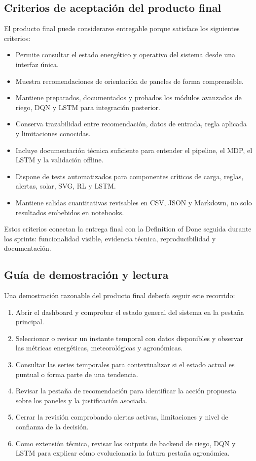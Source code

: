 ﻿\documentclass[11pt,a4paper]{article}
\begin{document}
\subsection{Criterios de aceptación del producto final}

El producto final puede considerarse entregable porque satisface los siguientes criterios:

\begin{itemize}
    \item Permite consultar el estado energético y operativo del sistema desde una interfaz única.
    \item Muestra recomendaciones de orientación de paneles de forma comprensible.
    \item Mantiene preparados, documentados y probados los módulos avanzados de riego, DQN y LSTM para integración posterior.
    \item Conserva trazabilidad entre recomendación, datos de entrada, regla aplicada y limitaciones conocidas.
    \item Incluye documentación técnica suficiente para entender el pipeline, el MDP, el LSTM y la validación offline.
    \item Dispone de tests automatizados para componentes críticos de carga, reglas, alertas, solar, SVG, RL y LSTM.
    \item Mantiene salidas cuantitativas revisables en CSV, JSON y Markdown, no solo resultados embebidos en notebooks.
\end{itemize}

Estos criterios conectan la entrega final con la Definition of Done seguida durante los sprints: funcionalidad visible, evidencia técnica, reproducibilidad y documentación.

\subsection{Guía de demostración y lectura}

Una demostración razonable del producto final debería seguir este recorrido:

\begin{enumerate}
    \item Abrir el dashboard y comprobar el estado general del sistema en la pestaña principal.
    \item Seleccionar o revisar un instante temporal con datos disponibles y observar las métricas energéticas, meteorológicas y agronómicas.
    \item Consultar las series temporales para contextualizar si el estado actual es puntual o forma parte de una tendencia.
    \item Revisar la pestaña de recomendación para identificar la acción propuesta sobre los paneles y la justificación asociada.
    \item Cerrar la revisión comprobando alertas activas, limitaciones y nivel de confianza de la decisión.
    \item Como extensión técnica, revisar los outputs de backend de riego, DQN y LSTM para explicar cómo evolucionaría la futura pestaña agronómica.
\end{enumerate}
\end{document}
